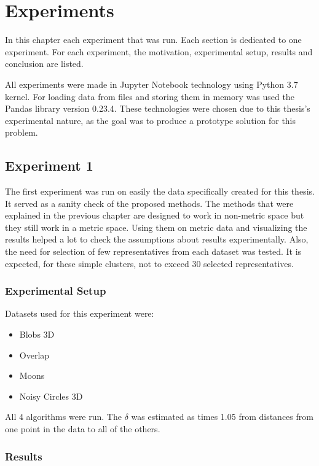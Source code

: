 \documentclass[thesis=B,english]{FITthesis}[2012/10/20]
\begin{document}
\chapter{Experiments}
In this chapter each experiment that was run.
Each section is dedicated to one experiment.
For each experiment, the motivation, experimental setup, results and conclusion are listed.

All experiments were made in Jupyter Notebook technology using Python 3.7 kernel.
For loading data from files and storing them in memory was used the Pandas library version 0.23.4.
These technologies were chosen due to this thesis's experimental nature, as the goal was to produce a prototype solution for this problem.

\section{Experiment 1}\label{sec:exp1}

The first experiment was run on easily the data specifically created for this thesis.
It served as a sanity check of the proposed methods.
The methods that were explained in the previous chapter are designed to work in non-metric space but they still work in a metric space.
Using them on metric data and visualizing the results helped a lot to check the assumptions about results experimentally.
Also, the need for selection of few representatives from each dataset was tested.
It is expected, for these simple clusters, not to exceed 30 selected representatives.

\subsection{Experimental Setup}
Datasets used for this experiment were:
\begin{itemize}
    \item Blobs 3D
    \item Overlap
    \item Moons
    \item Noisy Circles 3D
\end{itemize}

All 4 algorithms were run.
The $\delta$ was estimated as  times 1.05 from distances from one point in the data to all of the others.

\subsection{Results}
\end{document}
